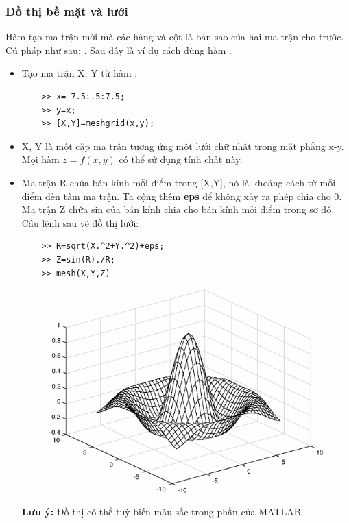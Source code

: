 \documentclass[12pt,a4paper]{article}
\begin{document}
\subsubsection{Đồ thị bề mặt và lưới}
Hàm  tạo ma trận mới mà các hàng và cột là bản sao của hai ma trận cho trước. Cú pháp như sau: . Sau đây là ví dụ cách dùng hàm .
\begin{itemize}
	\item Tạo ma trận X, Y từ hàm :
\begin{lstlisting}
	>> x=-7.5:.5:7.5;
	>> y=x;
	>> [X,Y]=meshgrid(x,y);
\end{lstlisting}	
	\item X, Y là một cặp ma trận tương ứng một lưới chữ nhật trong mặt phẳng x-y. Mọi hàm $z=f(x,y)$ có thể sử dụng tính chất này.
	\item Ma trận R chứa bán kính mỗi điểm trong [X,Y], nó là khoảng cách từ mỗi điểm đến tâm ma trận. Ta cộng thêm \textbf{eps} để không xảy ra phép chia cho 0. Ma trận Z chứa sin của bán kính chia cho bán kính mỗi điểm trong sơ đồ. Câu lệnh sau vẽ đồ thị  lưới:
\begin{lstlisting}
	>> R=sqrt(X.^2+Y.^2)+eps;
	>> Z=sin(R)./R;
	>> mesh(X,Y,Z)
\end{lstlisting}
\begin{center}
	\begin{figure}[H]
	\begin{center}
		\includegraphics[scale=0.6]{hinhtieuluan/dothi16}
	\end{center}
		\caption{}
		\label{refdothi16}
	\end{figure}
\end{center}
\textbf{Lưu ý:} Đồ thị có thể tuỳ biến màu sắc trong phần  của MATLAB.
\end{itemize}
\end{document}
